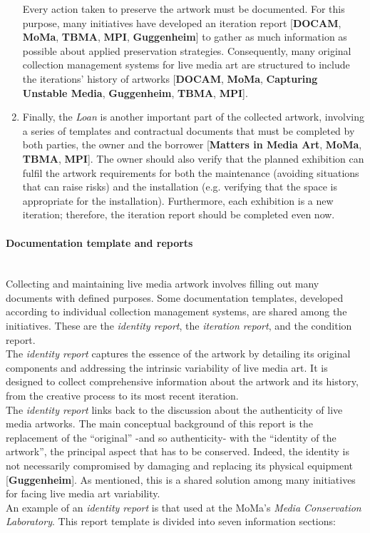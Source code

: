 \begin{enumerate}
    Every action taken to preserve the artwork must be documented. For this purpose, many initiatives have developed an iteration report [\textbf{DOCAM}, \textbf{MoMa}, \textbf{TBMA}, \textbf{MPI}, \textbf{Guggenheim}] to gather as much information as possible about applied preservation strategies. Consequently, many original collection management systems for live media art are structured to include the iterations’ history of artworks [\textbf{DOCAM}, \textbf{MoMa}, \textbf{Capturing Unstable Media}, \textbf{Guggenheim}, \textbf{TBMA}, \textbf{MPI}].\\
    \item Finally, the \textit{Loan} is another important part of the collected artwork, involving a series of templates and contractual documents that must be completed by both parties, the owner and the borrower [\textbf{Matters in Media Art}, \textbf{MoMa}, \textbf{TBMA}, \textbf{MPI}]. The owner should also verify that the planned exhibition can fulfil the artwork requirements for both the maintenance (avoiding situations that can raise risks) and the installation (e.g. verifying that the space is appropriate for the installation). Furthermore, each exhibition is a new iteration; therefore, the iteration report should be completed even now.
\end{enumerate}

\paragraph*{Documentation template and reports}\\

Collecting and maintaining live media artwork involves filling out many documents with defined purposes. Some documentation templates, developed according to individual collection management systems, are shared among the initiatives. These are the \textit{identity report}, the \textit{iteration report}, and the condition report.\\
\newline
The \textit{identity report} captures the essence of the artwork by detailing its original components and addressing the intrinsic variability of live media art. It is designed to collect comprehensive information about the artwork and its history, from the creative process to its most recent iteration.\\
The \textit{identity report} links back to the discussion about the authenticity of live media artworks. The main conceptual background of this report is the replacement of the ``original'' -and so authenticity- with the ``identity of the artwork'', the principal aspect that has to be conserved. Indeed, the identity is not necessarily compromised by damaging and replacing its physical equipment [\textbf{Guggenheim}]. As mentioned, this is a shared solution among many initiatives for facing live media art variability.\\
An example of an \textit{identity report} is that used at the MoMa’s \textit{Media Conservation Laboratory}. This report template is divided into seven information sections:

